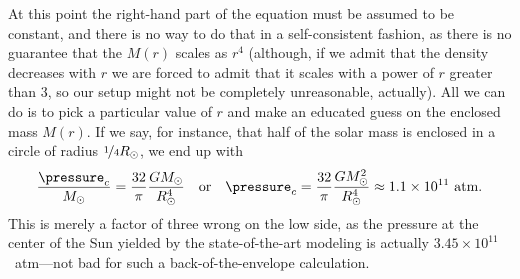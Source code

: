 \begin{marginfigure}
	
	\caption{Toy model for the Sun pressure profile as a function of the mass variable
	$M$.}
\end{marginfigure}

At this point the right-hand part of the equation must be assumed to be constant,
and there is no way to do that in a self-consistent fashion, as there is no guarantee
that the $M(r)$ scales as $r^4$ (although, if we admit that the density decreases
with $r$ we are forced to admit that it scales with a power of $r$ greater than 3,
so our setup might not be completely unreasonable, actually). All we can do is to pick
a particular value of $r$ and make an educated guess on the enclosed mass $M(r)$.
If we say, for instance, that half of the solar mass is enclosed in a circle of radius
$\nicefrac{1}{4} R_\odot$, we end up with
\begin{align*}
    \frac{\pressure_c}{M_\odot} = \frac{32}{\pi} \frac{G M_\odot}{R_\odot^4}
	  \quad\text{or}\quad
    \pressure_c = \frac{32}{\pi} \frac{G M_\odot^2}{R_\odot^4}
		\approx 1.1 \times 10^{11}~\text{atm}.
\end{align*}
This is merely a factor of three wrong on the low side, as the pressure at the
center of the Sun yielded by the state-of-the-art modeling is actually
$3.45 \times 10^{11}$~atm---not bad for such a back-of-the-envelope calculation.

